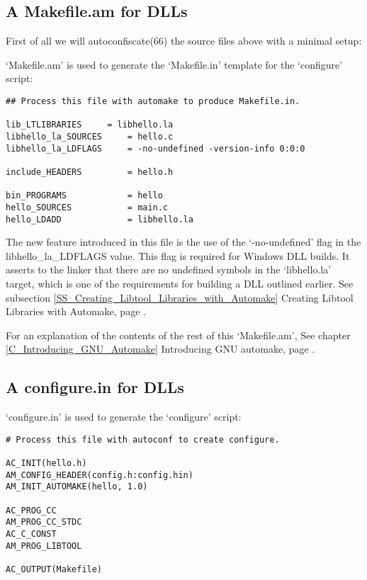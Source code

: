 \subsection{A Makefile.am for DLLs}

First of all we will autoconfiscate(66) the source files above with a minimal setup:

`Makefile.am' is used to generate the `Makefile.in' template for the `configure' script:

\begin{Verbatim}[frame=single]
## Process this file with automake to produce Makefile.in.

lib_LTLIBRARIES		= libhello.la
libhello_la_SOURCES     = hello.c
libhello_la_LDFLAGS     = -no-undefined -version-info 0:0:0

include_HEADERS         = hello.h

bin_PROGRAMS            = hello
hello_SOURCES           = main.c
hello_LDADD             = libhello.la
\end{Verbatim}

The new feature introduced in this file is the use of the `-no-undefined' flag 
in the libhello\_{}la\_{}LDFLAGS value. This flag is required for Windows 
DLL builds. It asserts to the linker that there are no undefined symbols 
in the `libhello.la' target, which is one of the requirements for building 
a DLL outlined earlier. See 
subsection \ref{SS_Creating_Libtool_Libraries_with_Automake}
Creating Libtool Libraries with Automake,
page \pageref{SS_Creating_Libtool_Libraries_with_Automake}.

For an explanation of the contents of the rest of this `Makefile.am',
See chapter \ref{C_Introducing_GNU_Automake} Introducing GNU automake,
page \pageref{C_Introducing_GNU_Automake}. 

\subsection{A configure.in for DLLs}

`configure.in' is used to generate the `configure' script:

\begin{Verbatim}[frame=single]
# Process this file with autoconf to create configure.

AC_INIT(hello.h)
AM_CONFIG_HEADER(config.h:config.hin)
AM_INIT_AUTOMAKE(hello, 1.0)

AC_PROG_CC
AM_PROG_CC_STDC
AC_C_CONST
AM_PROG_LIBTOOL

AC_OUTPUT(Makefile)
\end{Verbatim}

